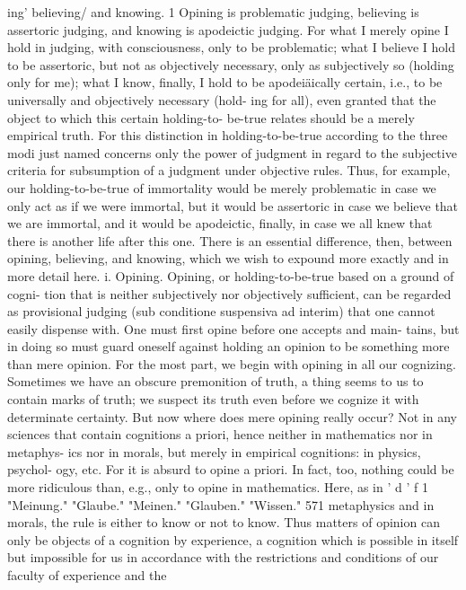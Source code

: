 ing' believing/ and knowing. 1 Opining is problematic judging, believing is
assertoric judging, and knowing is apodeictic judging. For what I merely
opine I hold in judging, with consciousness, only to be problematic; what I
believe I hold to be assertoric, but not as objectively necessary, only as
subjectively so (holding only for me); what I know, finally, I hold to be
apodeiäically certain, i.e., to be universally and objectively necessary (hold-
ing for all), even granted that the object to which this certain holding-to-
be-true relates should be a merely empirical truth. For this distinction in
holding-to-be-true according to the three modi just named concerns only
the power of judgment in regard to the subjective criteria for subsumption of
a judgment under objective rules.
Thus, for example, our holding-to-be-true of immortality would be
merely problematic in case we only act as if we were immortal, but it would
be assertoric in case we believe that we are immortal, and it would be apodeictic,
finally, in case we all knew that there is another life after this one.
There is an essential difference, then, between opining, believing, and
knowing, which we wish to expound more exactly and in more detail here.
i. Opining. Opining, or holding-to-be-true based on a ground of cogni-
tion that is neither subjectively nor objectively sufficient, can be regarded
as provisional judging (sub conditione suspensiva ad interim) that one cannot
easily dispense with. One must first opine before one accepts and main-
tains, but in doing so must guard oneself against holding an opinion to be
something more than mere opinion. For the most part, we begin with
opining in all our cognizing. Sometimes we have an obscure premonition
of truth, a thing seems to us to contain marks of truth; we suspect its truth
even before we cognize it with determinate certainty.
But now where does mere opining really occur? Not in any sciences that
contain cognitions a priori, hence neither in mathematics nor in metaphys-
ics nor in morals, but merely in empirical cognitions: in physics, psychol-
ogy, etc. For it is absurd to opine a priori. In fact, too, nothing could be
more ridiculous than, e.g., only to opine in mathematics. Here, as in
'
d
'
f
1
"Meinung."
"Glaube."
"Meinen."
"Glauben."
"Wissen."
571
metaphysics and in morals, the rule is either to know or not to know. Thus
matters of opinion can only be objects of a cognition by experience, a
cognition which is possible in itself but impossible for us in accordance
with the restrictions and conditions of our faculty of experience and the
